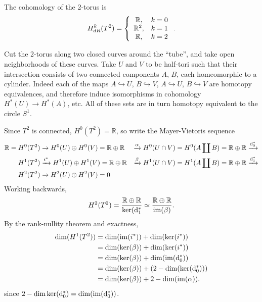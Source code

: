 \begin{xmpl}
The cohomology of the 2-torus is
$$
  H_{dR}^k(T^2)
= \left\{
    \begin{array}{c c}
      \mathbb{R},   & k = 0 \\
      \mathbb{R}^2, & k = 1 \\
      \mathbb{R},   & k = 2
    \end{array}
  \right..
$$

Cut the 2-torus along two closed curves around the ``tube'', and take
open neighborhoods of these curves. Take $U$ and $V$ to be half-tori
such that their intersection consists of two connected components
$A$, $B$, each
homeomorphic to a cylinder. Indeed each of the maps
$A \hookrightarrow U$,
$B \hookrightarrow V$,
$A \hookrightarrow U$,
$B \hookrightarrow V$
are homotopy equivalences, and therefore induce isomorphisms in
cohomology
$H^\ast(U) \to H^\ast(A)$, etc. All of these sets are in turn homotopy
equivalent to the circle $S^1$.

Since $T^2$ is connected,
$H^0(T^2) = \mathbb{R}$, so write the Mayer-Vietoris sequence
\begin{align*}
\mathbb{R} = H^0(T^2)                                           &\xrightarrow{}
H^0(U) \oplus H^0(V) = \mathbb{R} \oplus \mathbb{R}             &\xrightarrow{\alpha}
H^0(U \cap V) = H^0(A \coprod B) = \mathbb{R} \oplus \mathbb{R} &\xrightarrow{\mathop{}\!\mathrm{d}_0^\ast} \\
H^1(T^2)                                                        &\xrightarrow{i^\ast}
H^1(U) \oplus H^1(V) = \mathbb{R} \oplus \mathbb{R}             &\xrightarrow{\beta}
H^1(U \cap V) = H^1(A \coprod B) = \mathbb{R} \oplus \mathbb{R} &\xrightarrow{\mathop{}\!\mathrm{d}_1^\ast} \\
H^2(T^2)                                                        &\xrightarrow{}
H^2(U) \oplus H^2(V) = 0
\end{align*}
Working backwards,
$$
       H^2(T^2)
=      \frac{\mathbb{R} \oplus \mathbb{R}}
            {\ker(\mathop{}\!\mathrm{d}_1^\ast}
\simeq \frac{\mathbb{R} \oplus \mathbb{R}}
            {\mathrm{im}(\beta)}.
$$
By the rank-nullity theorem and exactness,
\begin{align*}
   \dim(H^1(T^2))
&= \dim(\mathrm{im}(i^\ast))
 + \dim(\ker(i^\ast)) \\
&= \dim(\ker(\beta))
 + \dim(\ker(i^\ast)) \\
&= \dim(\ker(\beta))
 + \dim(\mathrm{im}(\mathop{}\!\mathrm{d}_0^\ast)) \\
&= \dim(\ker(\beta))
 + (2 - \dim(\ker(\mathop{}\!\mathrm{d}_0^\ast))) \\
&= \dim(\ker(\beta))
 + 2
 - \dim(\mathrm{im}(\alpha)).
\end{align*}
since $2 - \dim \ker(\mathop{}\!\mathrm{d}_0^\ast) = \dim(\mathrm{im}(\mathop{}\!\mathrm{d}_0^\ast))$.


\end{xmpl}
